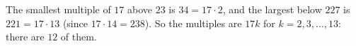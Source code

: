 The smallest multiple of $17$ above $23$ is $34=17\cdot2$, and the largest below $227$ is $221=17\cdot13$ (since $17\cdot14=238$). So the multiples are $17k$ for $k=2,3,\dots,13$: there are $\boxed{12}$ of them.
